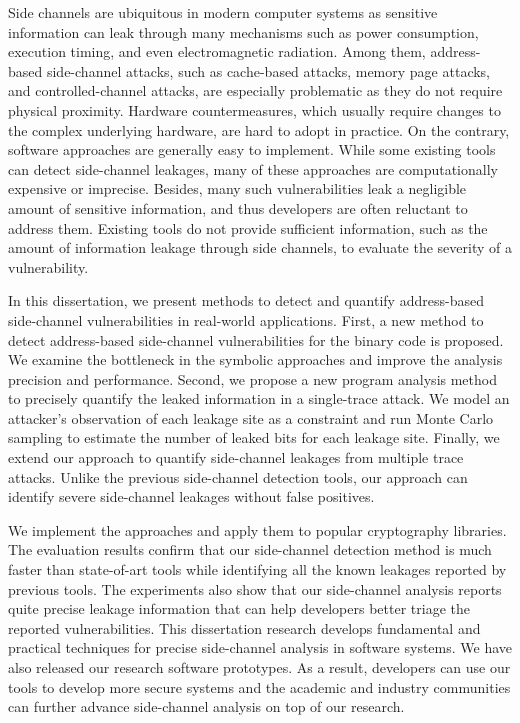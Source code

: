 
\vspace{-0.3in}
Side channels are ubiquitous in modern computer systems as sensitive
information can leak through many mechanisms such as power consumption, 
execution timing, and even electromagnetic radiation. Among them, 
address-based side-channel attacks, such as cache-based attacks, 
memory page attacks, and controlled-channel attacks, are especially
problematic as they do not require physical proximity. Hardware 
countermeasures, which usually require changes to the complex 
underlying hardware, are hard to adopt in practice.  On the contrary, 
software approaches are generally easy to implement. While some existing 
tools can detect side-channel leakages, many of these approaches are 
computationally expensive or imprecise. Besides, many such vulnerabilities 
leak a negligible amount of sensitive information, and thus developers 
are often reluctant to address them. Existing tools do not provide sufficient 
information, such as the amount of information leakage through side channels, 
to evaluate the severity of a vulnerability.

In this dissertation, we present methods to detect and quantify 
address-based side-channel vulnerabilities in real-world applications. 
First, a new method to detect address-based side-channel vulnerabilities 
for the binary code is proposed. We examine the bottleneck in the symbolic 
approaches and improve the analysis precision and performance.
Second, we propose a new program analysis method to precisely quantify
the leaked information in a single-trace attack. We model an
attacker’s observation of each leakage site as a constraint and run
Monte Carlo sampling to estimate the number of leaked bits for each
leakage site. Finally, we extend our approach to quantify side-channel 
leakages from multiple trace attacks.  Unlike the previous side-channel 
detection tools, our approach can identify severe side-channel
leakages without false positives. 

We implement the approaches and apply them to popular cryptography libraries.  
The evaluation results confirm that our side-channel detection method 
is much faster than state-of-art tools while identifying all the known leakages 
reported by previous tools.
The experiments also show that 
our side-channel analysis reports quite precise leakage information
that can help developers better triage the reported vulnerabilities.
This dissertation research develops fundamental and practical techniques for precise side-channel 
analysis in software systems. We have also released our research software prototypes.
As a result, developers can use our tools to develop more secure systems and the academic and industry
communities can further advance side-channel analysis on top of our research.